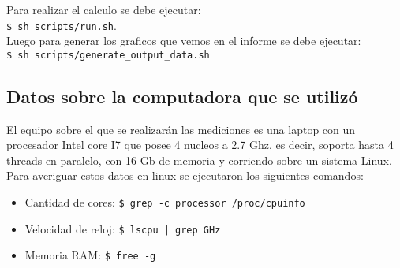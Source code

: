     Para realizar el calculo se debe ejecutar: \\
    \lstinline[columns=fixed]{$ sh scripts/run.sh}.\\

    Luego para generar los graficos que vemos en el informe se debe
    ejecutar: \\
    \lstinline[columns=fixed]{$ sh scripts/generate_output_data.sh}

\subsection{Datos sobre la computadora que se utilizó}
    El equipo sobre el que se realizarán las mediciones es una laptop con un
    procesador Intel core I7 que posee 4 nucleos a 2.7 Ghz, es decir, soporta
    hasta 4 threads en paralelo, con 16 Gb de memoria y corriendo sobre un
    sistema Linux.\\
    Para averiguar estos datos en linux se ejecutaron los siguientes comandos:\\
    \begin{itemize}
        \item Cantidad de cores: \lstinline[columns=fixed]{$ grep -c processor /proc/cpuinfo}
        \item Velocidad de reloj: \lstinline[columns=fixed]{$ lscpu | grep GHz}
        \item Memoria RAM: \lstinline[columns=fixed]{$ free -g}
    \end{itemize}
